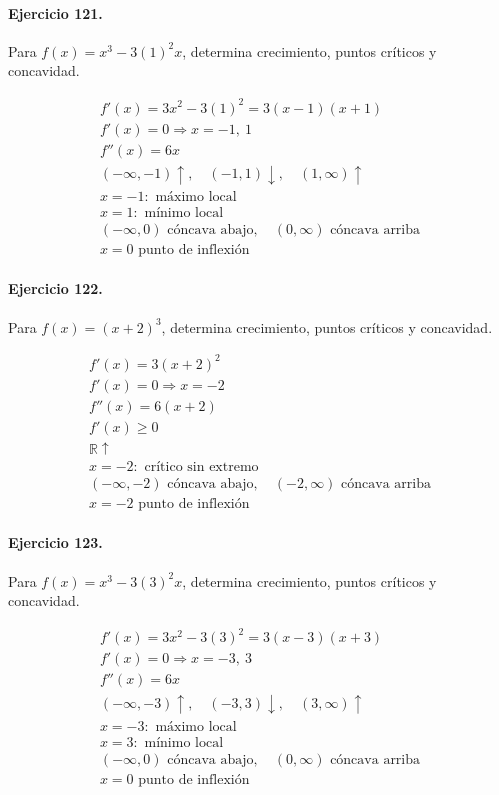 \documentclass[11pt,a4paper]{article}
\begin{document}
\paragraph{Ejercicio 121.} Para $f(x)=x^3-3(1)^2x$, determina crecimiento, puntos críticos y concavidad.

\[
\begin{aligned}
f'(x)=3x^2-3(1)^2=3(x-1)(x+1)\\
f'(x)=0\Rightarrow x=-1,\ 1\\
f''(x)=6x\\
(-\infty,-1)\uparrow,\quad(-1,1)\downarrow,\quad(1,\infty)\uparrow\\
x=-1:\text{ máximo local}\\
x=1:\text{ mínimo local}\\
(-\infty,0)\text{{ cóncava abajo}},\quad(0,\infty)\text{{ cóncava arriba}}\\
x=0\text{{ punto de inflexión}}
\end{aligned}
\]


\paragraph{Ejercicio 122.} Para $f(x)=(x+2)^3$, determina crecimiento, puntos críticos y concavidad.

\[
\begin{aligned}
f'(x)=3(x+2)^2\\
f'(x)=0\Rightarrow x=-2\\
f''(x)=6(x+2)\\
f'(x)\ge0\\
\mathbb{R}\uparrow\\
x=-2:\text{ crítico sin extremo}\\
(-\infty,-2)\text{ cóncava abajo},\quad(-2,\infty)\text{ cóncava arriba}\\
x=-2\text{ punto de inflexión}
\end{aligned}
\]


\paragraph{Ejercicio 123.} Para $f(x)=x^3-3(3)^2x$, determina crecimiento, puntos críticos y concavidad.

\[
\begin{aligned}
f'(x)=3x^2-3(3)^2=3(x-3)(x+3)\\
f'(x)=0\Rightarrow x=-3,\ 3\\
f''(x)=6x\\
(-\infty,-3)\uparrow,\quad(-3,3)\downarrow,\quad(3,\infty)\uparrow\\
x=-3:\text{ máximo local}\\
x=3:\text{ mínimo local}\\
(-\infty,0)\text{{ cóncava abajo}},\quad(0,\infty)\text{{ cóncava arriba}}\\
x=0\text{{ punto de inflexión}}
\end{aligned}
\]
\end{document}
